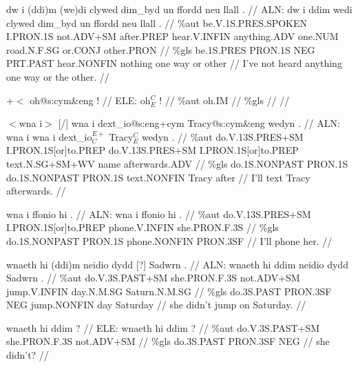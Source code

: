 \documentclass[a4paper,10pt]{article}
\begin{document}
\ex
\begingl[lingstyle=gergl]
\glchat dw i (ddi)m (we)di clywed dim\_byd un ffordd neu llall . //
\glsurface ALN:  dw i ddim wedi clywed dim\_byd un ffordd neu llall .  //
\glauto \%aut  be{\scriptsize .V.1S.PRES.SPOKEN} I{\scriptsize .PRON.1S} not{\scriptsize .ADV+SM} after{\scriptsize .PREP} hear{\scriptsize .V.INFIN} anything{\scriptsize .ADV} one{\scriptsize .NUM} road{\scriptsize .N.F.SG} or{\scriptsize .CONJ} other{\scriptsize .PRON}   //
\glmanual \%gls  be{\scriptsize .1S.PRES} PRON{\scriptsize .1S} NEG PRT{\scriptsize .PAST} hear{\scriptsize .NONFIN} nothing one way or other   //
\gleng I've not heard anything one way or the other. //
\endgl
\xe

\ex
\begingl[lingstyle=gergl]
\glchat +$<$ oh@s:cym\&eng ! //
\glsurface ELE:  oh$^{C}_{E}$ !  //
\glauto \%aut  oh{\scriptsize .IM}   //
\glmanual \%gls     //
\gleng  //
\endgl
\xe

\ex
\begingl[lingstyle=gergl]
\glchat $<$wna i$>$ [/] wna i dext\_io@s:eng+cym Tracy@s:cym\&eng wedyn . //
\glsurface ALN:  wna i wna i dext\_io$^{E+}_{C}$ Tracy$^{C}_{E}$ wedyn .  //
\glauto \%aut  do{\scriptsize .V.13S.PRES+SM} I{\scriptsize .PRON.1S[or]to.PREP} do{\scriptsize .V.13S.PRES+SM} I{\scriptsize .PRON.1S[or]to.PREP} text{\scriptsize .N.SG+SM+WV} name afterwards{\scriptsize .ADV}   //
\glmanual \%gls  do{\scriptsize .1S.NONPAST} PRON{\scriptsize .1S} do{\scriptsize .1S.NONPAST} PRON{\scriptsize .1S} text{\scriptsize .NONFIN} Tracy after   //
\gleng I'll text Tracy afterwards. //
\endgl
\xe

\ex
\begingl[lingstyle=gergl]
\glchat wna i ffonio hi . //
\glsurface ALN:  wna i ffonio hi .  //
\glauto \%aut  do{\scriptsize .V.13S.PRES+SM} I{\scriptsize .PRON.1S[or]to.PREP} phone{\scriptsize .V.INFIN} she{\scriptsize .PRON.F.3S}   //
\glmanual \%gls  do{\scriptsize .1S.NONPAST} PRON{\scriptsize .1S} phone{\scriptsize .NONFIN} PRON{\scriptsize .3SF}   //
\gleng I'll phone her. //
\endgl
\xe

\ex
\begingl[lingstyle=gergl]
\glchat wnaeth hi (ddi)m neidio dydd [?] Sadwrn . //
\glsurface ALN:  wnaeth hi ddim neidio dydd Sadwrn .  //
\glauto \%aut  do{\scriptsize .V.3S.PAST+SM} she{\scriptsize .PRON.F.3S} not{\scriptsize .ADV+SM} jump{\scriptsize .V.INFIN} day{\scriptsize .N.M.SG} Saturn{\scriptsize .N.M.SG}   //
\glmanual \%gls  do{\scriptsize .3S.PAST} PRON{\scriptsize .3SF} NEG jump{\scriptsize .NONFIN} day Saturday   //
\gleng she didn't jump on Saturday. //
\endgl
\xe

\ex
\begingl[lingstyle=gergl]
\glchat wnaeth hi ddim ? //
\glsurface ELE:  wnaeth hi ddim ?  //
\glauto \%aut  do{\scriptsize .V.3S.PAST+SM} she{\scriptsize .PRON.F.3S} not{\scriptsize .ADV+SM}   //
\glmanual \%gls  do{\scriptsize .3S.PAST} PRON{\scriptsize .3SF} NEG   //
\gleng she didn't? //
\endgl
\xe
\end{document}
